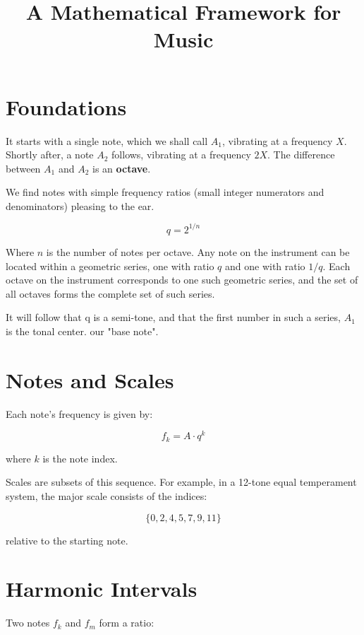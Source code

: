 \documentclass{article}
\title{A Mathematical Framework for Music}
\author{}
\date{}
\begin{document}
\maketitle

\section{Foundations}
It starts with a single note, which we shall call $A_1$, vibrating at a frequency $X$. Shortly after, a note $A_2$ follows, vibrating at a frequency $2X$. The difference between $A_1$ and $A_2$ is an \textbf{octave}.

We find notes with simple frequency ratios (small integer numerators and denominators) pleasing to the ear.


\begin{equation}
    q = 2^{1/n}
\end{equation}

Where $n$ is the number of notes per octave. Any note on the instrument can be located within a geometric series, one with ratio $q$ and one with ratio $1/q$. Each octave on the instrument corresponds to one such geometric series, and the set of all octaves forms the complete set of such series.


It will follow that q is a semi-tone, and that the first number in such a series, $A_1$ is the tonal center. our "base note".

\section{Notes and Scales}
Each note's frequency is given by:

\begin{equation}
    f_k = A \cdot q^k
\end{equation}

where $k$ is the note index. 

Scales are subsets of this sequence. For example, in a 12-tone equal temperament system, the major scale consists of the indices:

\begin{equation}
    \{0, 2, 4, 5, 7, 9, 11\}
\end{equation}

relative to the starting note.

\section{Harmonic Intervals}
Two notes $f_k$ and $f_m$ form a ratio:
\end{document}
